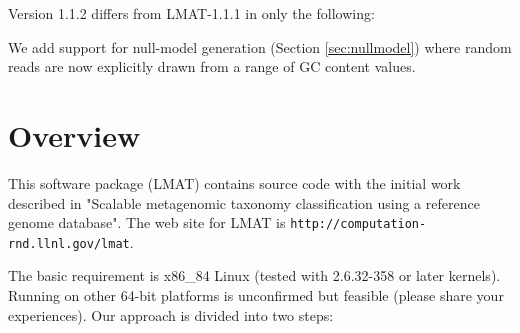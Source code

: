 \documentclass[11pt]{article}
\begin{document}
Version 1.1.2 differs from LMAT-1.1.1 in only the following:

We add support for null-model generation (Section \ref{sec:nullmodel})
where random reads are now explicitly drawn from a range of GC content
values.


\section{Overview}

This software package (LMAT) contains source code with the initial work described in
"Scalable metagenomic taxonomy classification using a reference genome 
database".   
     The web site for LMAT is \texttt{http://computation-rnd.llnl.gov/lmat}.  
     
The basic requirement is x86_84 Linux (tested with 2.6.32-358 or later kernels).  Running on other 64-bit platforms is unconfirmed but feasible (please share your experiences).
Our approach is divided into two steps:
\end{document}
